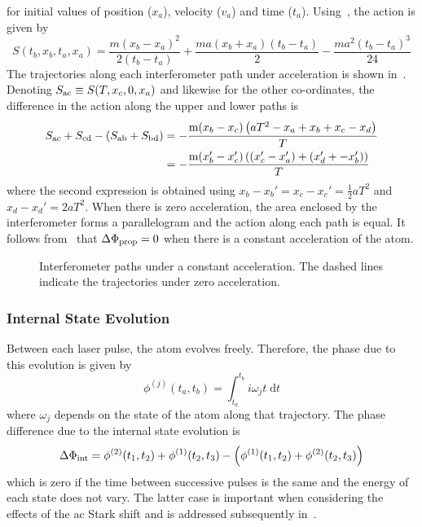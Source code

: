 for initial values of position ($x_a$), velocity ($v_a$) and time
($t_a$).     
Using~, the action is given by 
\begin{equation}
  \label{eq:action_classical}
  S(t_b,x_b,t_a,x_a) = \frac{m(x_b-x_a)^2}{2(t_b-t_a)} + \frac{m a
  (x_b+x_a)(t_b-t_a)}{2} -\frac{m a^2 (t_b-t_a)^3}{24} 
\end{equation}
The trajectories along each interferometer path under acceleration is
shown in~. Denoting
$S_\textnormal{ac} \equiv S(T,x_c,0,x_a)$ and likewise for the other
co-ordinates, the difference in the action along the upper and lower paths is 
\begin{align}
  S_\textnormal{ac} + S_\textnormal{cd} -
\left(S_\textnormal{ab}+S_\textnormal{bd}\right) &= -\frac{\text{m}
(x_b-x_c) \left(a T^2- x_a+x_b+x_c-x_d\right)}{T}\nonumber \\
&= -\frac{\text{m}
(x'_b-x'_c) \left((x'_c-x'_a) + (x'_d+-x'_b)\right)}{T}
\label{eq:prop_action}
\end{align}
where the second expression is obtained using $x_b - x_b' = x_c - x_c'
= \frac{1}{2}a T^2$ and $x_d-x_d' = 2 a T^2$. When there is zero
acceleration, the area enclosed by the interferometer forms a
parallelogram and the action along each path is equal. It follows
from~ that $\Delta \Phi_\textnormal{prop} =
0$ when there is a constant acceleration of the atom.
\begin{figure}[htpb]
  \centering
  \resizebox{0.8\textwidth}{!}{}
  \caption[Interferemeter paths under constant
  acceleration]{Interferometer paths under a constant acceleration.
  The dashed lines indicate the trajectories under zero acceleration.}
\label{fig:interferometer_accel}
\end{figure}
\subsubsection{Internal State Evolution}
Between each laser pulse, the atom evolves freely. Therefore, the
phase due to this evolution is given by
\begin{equation}
  \label{eq:internal_evolution}
  \phi^{(j)}(t_a,t_b) = \int_{t_a}^{t_b} i \omega_j t\;\mathrm{d} t
\end{equation}
where $\omega_j$ depends on the state of the atom along that
trajectory. The phase difference due to the internal state evolution
is 
\begin{equation}
  \label{eq:phase_internal}
  \Delta \Phi_\textnormal{int} = \phi^{(2)}(t_1,t_2) +
  \phi^{(1)}(t_2,t_3) - \left(\phi^{(1)}(t_1,t_2) + \phi^{(2)}(t_2,t_3)\right)
\end{equation}
which is zero if the time between successive pulses is the same and
the energy of each state does not vary. The latter case is important
when considering the effects of the ac Stark shift and is addressed
subsequently in~.

